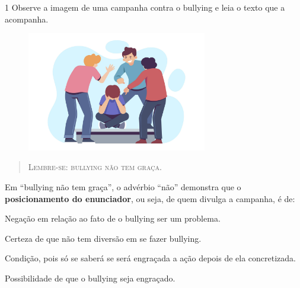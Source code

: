 \num{1} Observe a imagem de uma campanha contra o bullying e leia o
texto que a acompanha.

\begin{figure}[H]
\centering\includegraphics[width=0.7\textwidth]{./imgSAEB_6_POR/freepik/PORT_6_IMG-27.jpeg}
\end{figure}

\begin{quote}
\centering\textsc{Lembre-se: bullying não tem graça.}
\end{quote}

\noindent Em ``bullying não tem graça'', o advérbio ``não'' demonstra que o
\textbf{posicionamento do enunciador}, ou seja, de quem divulga a
campanha, é de:

\begin{escolha}
\item Negação em relação ao fato de o bullying ser um problema.
\item Certeza de que não tem diversão em se fazer bullying.
\item Condição, pois só se saberá se será engraçada a ação depois de ela
concretizada.
\item Possibilidade de que o bullying seja engraçado.
\end{escolha}



